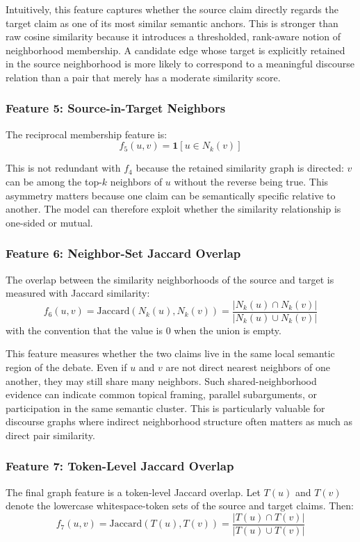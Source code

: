 \documentclass[11pt,a4paper]{article}
\begin{document}
Intuitively, this feature captures whether the source claim directly regards the target claim as one of its most similar semantic anchors. This is stronger than raw cosine similarity because it introduces a thresholded, rank-aware notion of neighborhood membership. A candidate edge whose target is explicitly retained in the source neighborhood is more likely to correspond to a meaningful discourse relation than a pair that merely has a moderate similarity score.

\subsubsection{Feature 5: Source-in-Target Neighbors}
The reciprocal membership feature is:
\begin{equation}
f_5(u,v) =
\mathbf{1}[u \in N_k(v)]
\end{equation}

This is not redundant with \(f_4\) because the retained similarity graph is directed: \(v\) can be among the top-\(k\) neighbors of \(u\) without the reverse being true. This asymmetry matters because one claim can be semantically specific relative to another. The model can therefore exploit whether the similarity relationship is one-sided or mutual.

\subsubsection{Feature 6: Neighbor-Set Jaccard Overlap}
The overlap between the similarity neighborhoods of the source and target is measured with Jaccard similarity:
\begin{equation}
f_6(u,v)
=
\mathrm{Jaccard}(N_k(u), N_k(v))
=
\frac{|N_k(u)\cap N_k(v)|}{|N_k(u)\cup N_k(v)|}
\end{equation}
with the convention that the value is \(0\) when the union is empty.

This feature measures whether the two claims live in the same local semantic region of the debate. Even if \(u\) and \(v\) are not direct nearest neighbors of one another, they may still share many neighbors. Such shared-neighborhood evidence can indicate common topical framing, parallel subarguments, or participation in the same semantic cluster. This is particularly valuable for discourse graphs where indirect neighborhood structure often matters as much as direct pair similarity.

\subsubsection{Feature 7: Token-Level Jaccard Overlap}
The final graph feature is a token-level Jaccard overlap. Let \(T(u)\) and \(T(v)\) denote the lowercase whitespace-token sets of the source and target claims. Then:
\begin{equation}
f_7(u,v)
=
\mathrm{Jaccard}(T(u), T(v))
=
\frac{|T(u)\cap T(v)|}{|T(u)\cup T(v)|}
\end{equation}
\end{document}
